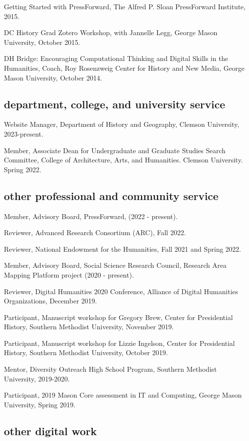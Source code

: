 \documentclass[11pt]{article}
\begin{document}
Getting Started with PressForward, The Alfred P. Sloan PressForward Institute, 2015.

DC History Grad Zotero Workshop, with Jannelle Legg, George Mason University, October 2015.

DH Bridge: Encouraging Computational Thinking and Digital Skills in the Humanities, Coach, Roy Rosenzweig Center for History and New Media, George Mason University, October 2014.

\subsection{department, college, and university service}\label{Department, College, and University Service}
Website Manager, Department of History and Geography, Clemson University, 2023-present.

Member, Associate Dean for Undergraduate and Graduate Studies Search Committee, College of Architecture, Arts, and Humanities. Clemson University. Spring 2022.

\subsection{other professional and community service}\label{Other Professional and Community Service}
Member, Advisory Board, PressForward, (2022 - present).

Reviewer, Advanced Research Consortium (ARC), Fall 2022. 

Reviewer, National Endowment for the Humanities, Fall 2021 and Spring 2022.

Member, Advisory Board, Social Science Research Council, Research Area Mapping Platform project (2020 - present).

Reviewer, Digital Humanities 2020 Conference, Alliance of Digital Humanities Organizations, December 2019.

Participant, Manuscript workshop for Gregory Brew, Center for Presidential History, Southern Methodist University, November 2019.

Participant, Manuscript workshop for Lizzie Ingelson, Center for Presidential History, Southern Methodist University, October 2019.

Mentor, Diversity Outreach High School Program, Southern Methodist University, 2019-2020.

Participant, 2019 Mason Core assessment in IT and Computing, George Mason University, Spring 2019.

\subsection{other digital work}\label{other-digital-work}
\end{document}
